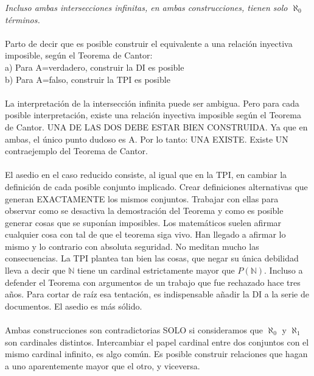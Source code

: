 	\noindent
	\textit{Incluso ambas intersecciones infinitas, en ambas construcciones, tienen solo $\aleph_{0}$ términos.}\\\\
	
	\noindent
	Parto de decir que es posible construir el equivalente a una relación inyectiva imposible, según el Teorema de Cantor:\\
	a) Para A=verdadero, construir la DI es posible\\
	b) Para A=falso, construir la TPI es posible\\\\
	
	\noindent
	La interpretación de la intersección infinita puede ser ambigua. Pero para cada posible interpretación, existe una relación inyectiva imposible según el Teorema de Cantor. UNA DE LAS DOS DEBE ESTAR BIEN CONSTRUIDA. Ya que en ambas, el único punto dudoso es A. Por lo tanto: UNA EXISTE. Existe UN contraejemplo del Teorema de Cantor.\\\\
	
	\noindent
	El asedio en el caso reducido consiste, al igual que en la TPI, en cambiar la definición de cada posible conjunto implicado. Crear definiciones alternativas que generan EXACTAMENTE los mismos conjuntos. Trabajar con ellas para observar como se desactiva la demostración del Teorema y como es posible generar cosas que se suponían imposibles. Los matemáticos suelen afirmar cualquier cosa con tal de que el teorema siga vivo. Han llegado a afirmar lo mismo y lo contrario con absoluta seguridad. No meditan mucho las consecuencias. La TPI plantea tan bien las cosas, que negar su única debilidad lleva a decir que $\mathbb{N}$ tiene un cardinal estrictamente mayor que $P(\mathbb{N})$. Incluso a defender el Teorema con argumentos de un trabajo que fue rechazado hace tres años. Para cortar de raíz esa tentación, es indispensable añadir la DI a la serie de documentos. El asedio es más sólido.\\\\
	
	\noindent
	Ambas construcciones son contradictorias SOLO si consideramos que $\aleph_{0}$ y $\aleph_{1}$ son cardinales distintos. Intercambiar el papel cardinal entre dos conjuntos con el mismo cardinal infinito, es algo común. Es posible construir relaciones que hagan a uno aparentemente mayor que el otro, y viceversa.\\\\
	
